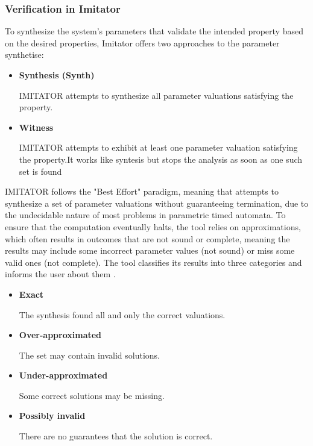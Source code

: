  


\subsubsection*{Verification in Imitator}

To synthesize the system's parameters that validate the intended property based on the desired properties, Imitator offers two approaches to the parameter synthetise\cite{IMITATOR}:

\begin{itemize}
    \item \textbf{Synthesis (Synth)}

    IMITATOR attempts to synthesize all parameter valuations satisfying the property.

    \item \textbf{Witness}

    IMITATOR attempts to exhibit at least one parameter valuation satisfying the property.It works like syntesis but stops the analysis as soon as one such set is found
    
\end{itemize}

IMITATOR follows the "Best Effort" paradigm, meaning that attempts to synthesize a set of parameter valuations without guaranteeing termination, due to the undecidable nature of most problems in parametric timed automata. To ensure that the computation eventually halts, the tool relies on approximations, which often results in outcomes that are not sound or complete, meaning the results may include some incorrect parameter values (not sound) or miss some valid ones (not complete). The tool classifies its results into three categories and informs the user about them \cite{imitator_slides}.

\begin{itemize}
    \item \textbf{Exact}

    The synthesis found all and only the correct valuations.

    \item \textbf{Over-approximated}

    The set may contain invalid solutions.

    \item \textbf{Under-approximated}

    Some correct solutions may be missing.

    \item \textbf{Possibly invalid}

    There are no guarantees that the solution is correct.


\end{itemize}

